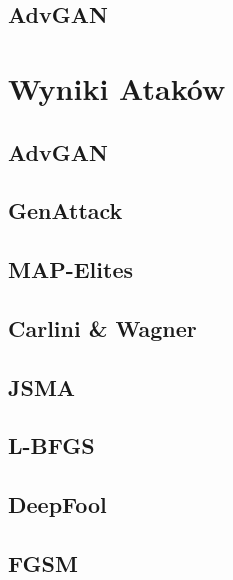 \documentclass{article}
\begin{document}
\subsection{AdvGAN}


\section{Wyniki Ataków}\label{comparison}
\subsection{AdvGAN}
\subsection{GenAttack}
\subsection{MAP-Elites}
\subsection{Carlini & Wagner}
\subsection{JSMA}
\subsection{L-BFGS}
\subsection{DeepFool}
\subsection{FGSM}
\end{document}
